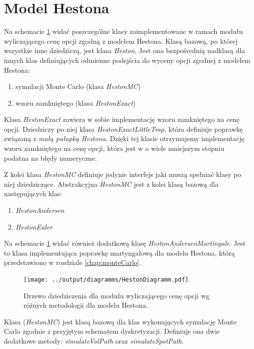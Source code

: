 \documentclass{pracamgr}
\begin{document}
\section{Model Hestona}
Na schemacie \ref{fig:currencyRisk} widać poszczególne klasy zaimplementowane w 
ramach modułu wyliczającego cenę opcji zgodną z modelem Hestona.
Klasą bazową, po której wszystkie inne dziedziczą, jest klasa \textit{Heston}.
Jest ona bezpośrednią nadklasą dla innych klas definiujących 
odmienne podejścia do wyceny opcji zgodnej z modelem Hestona:
\begin{enumerate}
  \item symulacji Monte Carlo (klasa \textit{HestonMC})
  \item wzoru zamkniętego (klasa \textit{HestonExact})
\end{enumerate}

Klasa \textit{HestonExact} zawiera w sobie implementację wzoru zamkniętego na cenę opcji.
Dziedziczy po niej klasa \textit{HestonExactLittleTrap}, która definiuje 
poprawkę związaną z \textit{małą pułapką Hestona}. Dzięki tej klasie 
otrzymujemy implementację wzoru zamkniętego na cenę opcji, która jest w o wiele
mniejszym stopniu podatna na błędy numeryczne.

Z kolei klasa \textit{HestonMC} definiuje jedynie interfejs jaki muszą spełniać klasy po niej 
dziedziczące.
Abstrakcyjna \textit{HestonMC} jest z kolei klasą bazową dla następujących klas:
\begin{enumerate}
  \item \textit{HestonAndersen} 
  \item \textit{HestonEuler} 
\end{enumerate}
Na schemacie \ref{fig:currencyRisk} widać również dodatkową klasę
\textit{HestonAndersenMartingale}. Jest to klasa implementująca 
poprawkę martyngałową dla modelu Hestona, którą przedstawiono 
w rozdziale \ref{chap:monteCarlo}.


\begin{figure}
  \centering  
  \texttt{[image: ../output/diagramms/HestonDiagramm.pdf]}
  \caption{Drzewo dziedziczenia dla modułu wyliczającego 
  cenę opcji wg różnych metodologii dla modelu Hestona.}\label{fig:currencyRisk}
\end{figure}

Klasa (\textit{HestonMC})
jest klasą bazową dla klas wykonujących symulację Monte Carlo zgodnie z 
przyjętym schematem dyskretyzacji. Definiuje ona dwie dodatkowe metody: \textit{simulateVolPath} oraz 
\textit{simulateSpotPath}.
\end{document}
